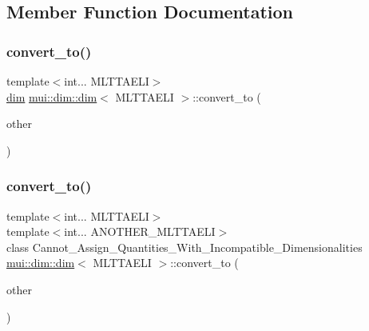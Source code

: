 \subsection{Member Function Documentation}
\mbox{\label{structmui_1_1dim_1_1dim_ad3a650609305c544581a749cb338a50b}} 
\subsubsection{\texorpdfstring{convert\+\_\+to()}{convert\_to()}\hspace{0.1cm}{\footnotesize\ttfamily [1/2]}}
{\footnotesize\ttfamily template$<$int... M\+L\+T\+T\+A\+E\+LI$>$ \\
\hyperlink{structmui_1_1dim_1_1dim}{dim} \hyperlink{structmui_1_1dim_1_1dim}{mui\+::dim\+::dim}$<$ M\+L\+T\+T\+A\+E\+LI $>$\+::convert\+\_\+to (\begin{DoxyParamCaption}\item[{const \hyperlink{structmui_1_1dim_1_1dim}{dim}$<$ M\+L\+T\+T\+A\+E\+LI $>$ \&}]{other }\end{DoxyParamCaption})\hspace{0.3cm}{\ttfamily [inline]}}

\mbox{\label{structmui_1_1dim_1_1dim_a3004be3cf40d7fed041b18eb841687ac}} 
\subsubsection{\texorpdfstring{convert\+\_\+to()}{convert\_to()}\hspace{0.1cm}{\footnotesize\ttfamily [2/2]}}
{\footnotesize\ttfamily template$<$int... M\+L\+T\+T\+A\+E\+LI$>$ \\
template$<$int... A\+N\+O\+T\+H\+E\+R\+\_\+\+M\+L\+T\+T\+A\+E\+LI$>$ \\
class Cannot\+\_\+\+Assign\+\_\+\+Quantities\+\_\+\+With\+\_\+\+Incompatible\+\_\+\+Dimensionalities \hyperlink{structmui_1_1dim_1_1dim}{mui\+::dim\+::dim}$<$ M\+L\+T\+T\+A\+E\+LI $>$\+::convert\+\_\+to (\begin{DoxyParamCaption}\item[{const \hyperlink{structmui_1_1dim_1_1dim}{dim}$<$ A\+N\+O\+T\+H\+E\+R\+\_\+\+M\+L\+T\+T\+A\+E\+L\+I... $>$ \&}]{other }\end{DoxyParamCaption})}

